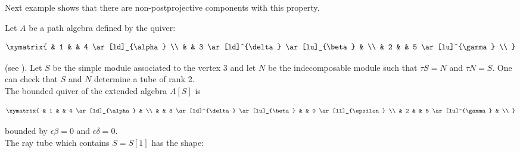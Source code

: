 Next example shows that there are non-postprojective components with this property. 

\begin{exmp}
\label{tuboraio} 
{\rm 
Let $A$ be a path algebra defined by the quiver:

$$\xymatrix{
       &          1      &                              &          4     \ar[ld]_{\alpha}                                  \\
         &                &                  3     \ar[ld]^{\delta} \ar[lu]_{\beta}      &                                                   \\
         &       2         &                              &          5 \ar[lu]^{\gamma}            \\
}$$

\par\noindent
(see \cite{coelhosilva1}). 
Let $S$ be the simple module associated to the vertex $3$ and let $N$ be the indecomposable module such that $\tau S=N$ and $\tau N= S$. One can check that $S$ and $N$ determine a tube of rank 2.\\
The bounded quiver of the extended algebra $A[S]$ is

$$\xymatrix{
       &          1      &                              &          4     \ar[ld]_{\alpha}           &                       \\
         &                &                  3     \ar[ld]^{\delta} \ar[lu]_{\beta}      &      &   0 \ar[ll]_{\epsilon}                                          \\
        &       2         &                              &          5 \ar[lu]^{\gamma}      &      \\
}$$

\par\noindent
bounded by $\epsilon\beta=0$ and $\epsilon\delta=0$.\\
The ray tube which contains $S=S[1]$ has the shape:

}
\end{exmp}
